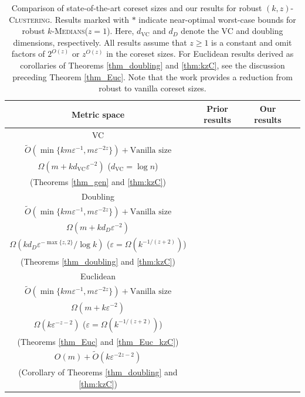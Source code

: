 \documentclass[11pt,letterpaper]{article}
\theoremstyle{definition}
\newcommand{\eps}{\varepsilon}
\newcommand{\VC}{\ensuremath{\mathrm{VC}}}
\newcommand{\ProblemName}[1]{\textsc{#1}}
\newcommand{\kzC}{\ProblemName{$(k, z)$-Clustering}\xspace}
\newcommand{\kMedian}{\ProblemName{$k$-Medians}\xspace}
\begin{document}
    \begin{table}[t]
		\centering
		\footnotesize
		
		\begin{tabular}{|c|c|c|c|}
			\hline
			Metric space & Prior results & Our results \\ \hline
			VC  & \specialcell{$O(m) + \tilde{O}(k^2 d_{\VC} \eps^{-2z-2})$ \cite{huang2025coresets} \\ $\tilde{O}(\min\{km\eps^{-1}, m\eps^{-2z}\}) + \text{Vanilla size}$ \cite{jiang2025coresets} \\ $\Omega(m+k d_{\VC} \eps^{-2})$ ($d_{\VC} = \log n$) \cite{huang2022near,Cohen2022Towards} } & \specialcell{ $O(m)+\tilde{O}(k d_{\VC} \eps^{-2z})$ $\ast$ \\ (Theorems \ref{thm_gen} and \ref{thm:kzC})}
                \\ \hline
			Doubling & \specialcell{$O(m) + \tilde{O}(k^2 d_D \eps^{-2z})$ \cite{huang2025coresets} \\ $\tilde{O}(\min\{km\eps^{-1}, m\eps^{-2z}\} ) + \text{Vanilla size}$ \cite{jiang2025coresets} \\ $\Omega(m +k d_D \eps^{-2})$ \cite{huang2022near,Cohen2022Towards} \\ $\Omega(k d_D \eps^{-\max\{z,2\}}/\log k)$ ($\eps = \Omega(k^{-1/(z+2)})$) \cite{huang2024optimal} } & \specialcell{$O(m) + \tilde{O}(k d_{D} \eps^{-2z})$ $\ast$ \\ (Theorems \ref{thm_doubling} and \ref{thm:kzC}) } \\ \hline
			Euclidean & \specialcell{$O(m) + \tilde{O}(k^2 \eps^{-2z-2})$ \cite{huang2025coresets} \\ $\tilde{O}(\min\{km\eps^{-1}, m\eps^{-2z}\} ) + \text{Vanilla size}$ \cite{jiang2025coresets} \\ $\Omega(m +k \eps^{-2})$ \cite{huang2022near,Cohen2022Towards} \\ $\Omega(k \eps^{-z-2})$ ($\eps = \Omega(k^{-1/(z+2)})$) \cite{huang2024optimal} } & \specialcell{$O(m \eps^{-z})+\tilde{O}(\min\{k^{\frac{2z+2}{z+2}}\eps^{-2}, k\eps^{-z-2}\})$ \\ (Theorems \ref{thm_Euc} and \ref{thm_Euc_kzC}) \\ $O(m) + \tilde{O}(k \eps^{-2z-2})$ \\ (Corollary of Theorems \ref{thm_doubling} and \ref{thm:kzC}) } \\ \hline
		\end{tabular}
        
\caption{Comparison of state-of-the-art coreset sizes and our results for robust \kzC. 
%
Results marked with $\ast$ indicate near-optimal worst-case bounds for robust \kMedian ($z=1$).
%
Here, \( d_{\VC} \) and \( d_D \) denote the VC and doubling dimensions, respectively.
%
All results assume that $z\geq 1$ is a constant and omit factors of $2^{O(z)}$ or $z^{O(z)}$ in the coreset sizes.
%
For Euclidean results derived as corollaries of Theorems \ref{thm_doubling} and \ref{thm:kzC}, see the discussion preceding Theorem \ref{thm_Euc}.
%
Note that the work \cite{jiang2025coresets} provides a reduction from robust to vanilla coreset sizes.
}

\label{tab:result}
\end{table}
\end{document}
